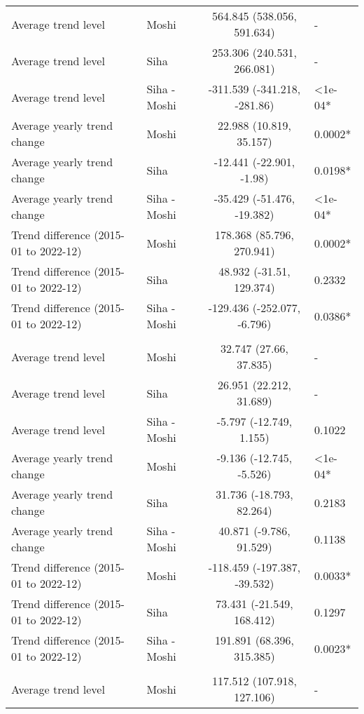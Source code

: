 \begin{longtable}{l|lcl}
\midrule\addlinespace[2.5pt]
\multicolumn{4}{l}{Diabetes Mellitus} \\[2.5pt] 
\midrule\addlinespace[2.5pt]
Average trend level & Moshi & 564.845 (538.056, 591.634) & - \\ 
Average trend level & Siha & 253.306 (240.531, 266.081) & - \\ 
Average trend level & Siha - Moshi & -311.539 (-341.218, -281.86) & <1e-04* \\ 
Average yearly trend change & Moshi & 22.988 (10.819, 35.157) & 0.0002* \\ 
Average yearly trend change & Siha & -12.441 (-22.901, -1.98) & 0.0198* \\ 
Average yearly trend change & Siha - Moshi & -35.429 (-51.476, -19.382) & <1e-04* \\ 
Trend difference (2015-01 to 2022-12) & Moshi & 178.368 (85.796, 270.941) & 0.0002* \\ 
Trend difference (2015-01 to 2022-12) & Siha & 48.932 (-31.51, 129.374) & 0.2332 \\ 
Trend difference (2015-01 to 2022-12) & Siha - Moshi & -129.436 (-252.077, -6.796) & 0.0386* \\ 
\midrule\addlinespace[2.5pt]
\multicolumn{4}{l}{Dysentery} \\[2.5pt] 
\midrule\addlinespace[2.5pt]
Average trend level & Moshi & 32.747 (27.66, 37.835) & - \\ 
Average trend level & Siha & 26.951 (22.212, 31.689) & - \\ 
Average trend level & Siha - Moshi & -5.797 (-12.749, 1.155) & 0.1022 \\ 
Average yearly trend change & Moshi & -9.136 (-12.745, -5.526) & <1e-04* \\ 
Average yearly trend change & Siha & 31.736 (-18.793, 82.264) & 0.2183 \\ 
Average yearly trend change & Siha - Moshi & 40.871 (-9.786, 91.529) & 0.1138 \\ 
Trend difference (2015-01 to 2022-12) & Moshi & -118.459 (-197.387, -39.532) & 0.0033* \\ 
Trend difference (2015-01 to 2022-12) & Siha & 73.431 (-21.549, 168.412) & 0.1297 \\ 
Trend difference (2015-01 to 2022-12) & Siha - Moshi & 191.891 (68.396, 315.385) & 0.0023* \\ 
\midrule\addlinespace[2.5pt]
\multicolumn{4}{l}{Epilepsy} \\[2.5pt] 
\midrule\addlinespace[2.5pt]
Average trend level & Moshi & 117.512 (107.918, 127.106) & - \\ 

\end{longtable}
